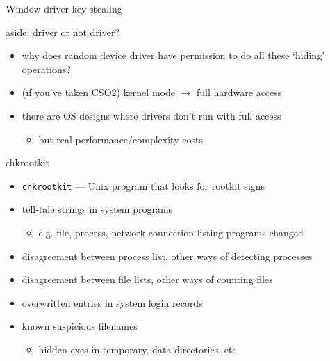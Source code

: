 \begin{frame}{Window driver key stealing}
\end{frame}

\begin{frame}{aside: driver or not driver?}
    \begin{itemize}
    \item why does random device driver have permission to do all these `hiding' operations?
    \vspace{.5cm}
    \item (if you've taken CSO2) kernel mode $\rightarrow$ full hardware access
    \item there are OS designs where drivers don't run with full access
        \begin{itemize}
        \item but real performance/complexity costs
        \end{itemize}
    \end{itemize}
\end{frame}

\begin{frame}{chkrootkit}
    \begin{itemize}
    \item \texttt{chkrootkit} --- Unix program that looks for rootkit signs
    \vspace{.5cm}
    \item tell-tale strings in system programs
        \begin{itemize}
        \item e.g. file, process, network connection listing programs changed
        \end{itemize}
    \item disagreement between process list, other ways of detecting processes
    \item disagreement between file lists, other ways of counting files
    \item overwritten entries in system login records
    \item known suspicious filenames
        \begin{itemize}
        \item hidden exes in temporary, data directories, etc.
        \end{itemize}
    \end{itemize}
\end{frame}
